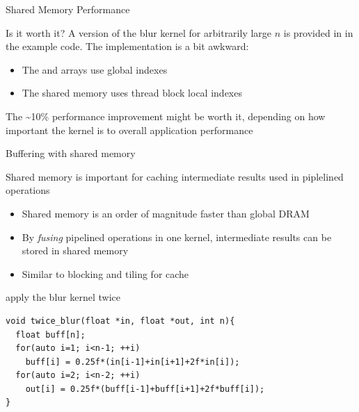\begin{frame}[fragile]{Shared Memory Performance}
    \begin{info}{Is it worth it?}
        A version of the blur kernel for arbitrarily large $n$ is provided in  in the example code. The implementation is a bit awkward:
        \begin{itemize}
            \item  The  and  arrays use global indexes
            \item  The shared memory uses thread block local indexes
        \end{itemize}
        The \textasciitilde10\% performance improvement might be worth it, depending on how important the kernel is to overall application performance
    \end{info}

\end{frame}

\begin{frame}[fragile]{Buffering with shared memory}
    \begin{info}{}
        Shared memory is important for caching intermediate results used in piplelined operations
        \begin{itemize}
            \item Shared memory is an order of magnitude faster than global DRAM
            \item By \emph{fusing} pipelined operations in one kernel, intermediate results can be stored in shared memory
            \item Similar to blocking and tiling for cache
        \end{itemize}
    \end{info}

    \begin{code}{apply the blur kernel twice}
        \begin{lstlisting}[style=boxcudatiny]
void twice_blur(float *in, float *out, int n){
  float buff[n];
  for(auto i=1; i<n-1; ++i)
    buff[i] = 0.25f*(in[i-1]+in[i+1]+2f*in[i]);
  for(auto i=2; i<n-2; ++i)
    out[i] = 0.25f*(buff[i-1]+buff[i+1]+2f*buff[i]);
}
        \end{lstlisting}
    \end{code}

\end{frame}

